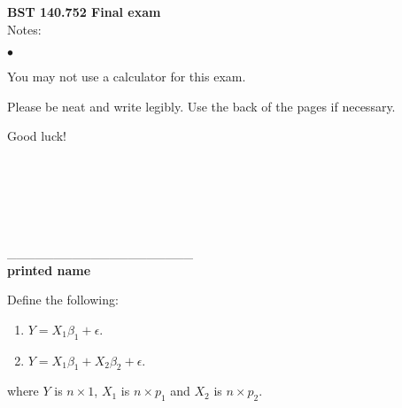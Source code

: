\documentclass[12pt]{article}
\begin{document}
\noindent
{\bf BST 140.752 Final exam} \\
Notes:
\begin{list}{$\bullet$}{}
\item You may not use a calculator for this exam.
\item Please be neat and write legibly. Use the back of the pages if necessary.
\item Good luck!
\end{list}
\ \\ \ \\ \ \\ \ \\ \ \\
 \_\_\_\_\_\_\_\_\_\_\_\_\_\_\_\_\_\_\_\_ \\
{\bf printed name}

\newpage

\noindent Define the following:
\begin{enumerate}[Model $(1)$]
	\item $Y = X_1 \beta_1 + \epsilon$.
	\item $Y = X_1 \beta_1 + X_2 \beta_2 + \epsilon$.
\end{enumerate}
where $Y$ is $n\times 1$, $X_1$ is $n\times p_1$ and $X_2$ is $n\times p_2$.
\end{document}
